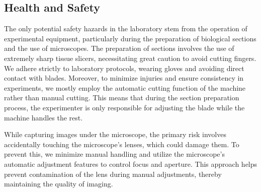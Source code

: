 



\subsection{Health and Safety}

The only potential safety hazards in the laboratory stem from the operation of experimental equipment, particularly during the preparation of biological sections and the use of microscopes. The preparation of sections involves the use of extremely sharp tissue slicers, necessitating great caution to avoid cutting fingers. We adhere strictly to laboratory protocols, wearing gloves and avoiding direct contact with blades. Moreover, to minimize injuries and ensure consistency in experiments, we mostly employ the automatic cutting function of the machine rather than manual cutting. This means that during the section preparation process, the experimenter is only responsible for adjusting the blade while the machine handles the rest.

While capturing images under the microscope, the primary risk involves accidentally touching the microscope's lenses, which could damage them. To prevent this, we minimize manual handling and utilize the microscope's automatic adjustment features to control focus and aperture. This approach helps prevent contamination of the lens during manual adjustments, thereby maintaining the quality of imaging.

